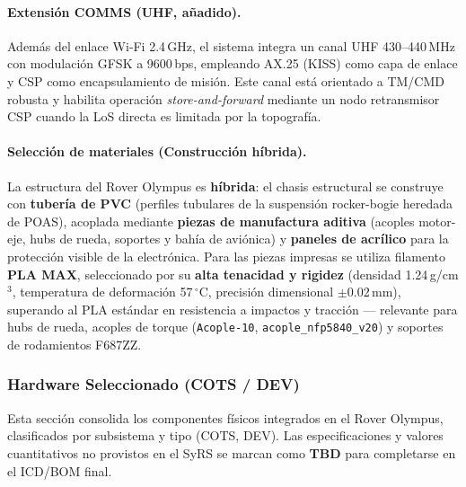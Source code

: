 \paragraph{Extensión COMMS (UHF, añadido).}
Además del enlace Wi‑Fi 2.4\,GHz, el sistema integra un canal UHF 430–440\,MHz con
modulación GFSK a 9600\,bps, empleando AX.25 (KISS) como capa de enlace y CSP como
encapsulamiento de misión. Este canal está orientado a TM/CMD robusta y habilita
operación \emph{store-and-forward} mediante un nodo retransmisor CSP cuando la LoS
directa es limitada por la topografía.

\paragraph{Selección de materiales (Construcción híbrida).}
La estructura del Rover Olympus es \textbf{híbrida}: el chasis estructural se construye con \textbf{tubería de PVC} (perfiles tubulares de la suspensión rocker-bogie heredada de POAS), acoplada mediante \textbf{piezas de manufactura aditiva} (acoples motor-eje, hubs de rueda, soportes y bahía de aviónica) y \textbf{paneles de acrílico} para la protección visible de la electrónica. Para las piezas impresas se utiliza filamento \textbf{PLA MAX}, seleccionado por su \textbf{alta tenacidad y rigidez} (densidad 1.24\,g/cm$^3$, temperatura de deformación 57\,$^{\circ}\mathrm{C}$, precisión dimensional $\pm$0.02\,mm), superando al PLA estándar en resistencia a impactos y tracción --- relevante para hubs de rueda, acoples de torque (\texttt{Acople-10}, \texttt{acople\_nfp5840\_v20}) y soportes de rodamientos F687ZZ.


\subsubsection{Hardware Seleccionado (COTS / DEV)}
\label{sec:hw_selected}

Esta sección consolida los componentes físicos integrados en el Rover Olympus,
clasificados por subsistema y tipo (COTS, DEV).  
Las especificaciones y valores cuantitativos no provistos en el SyRS se
marcan como \textbf{TBD} para completarse en el ICD/BOM final.

